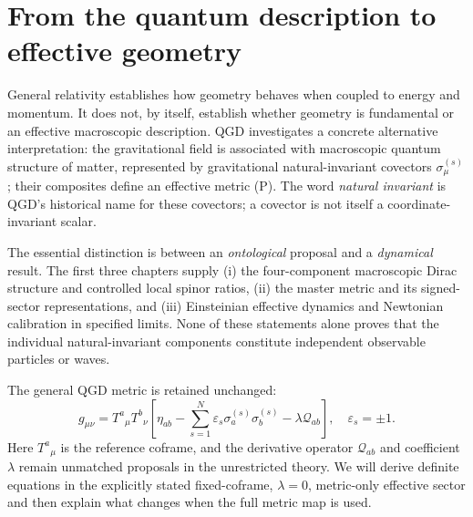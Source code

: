 \documentclass[11pt,a4paper]{article}
\begin{document}
\section{From the quantum description to effective geometry}
\label{sec:motivation}
General relativity establishes how geometry behaves when coupled to
energy and momentum. It does not, by itself, establish whether geometry
is fundamental or an effective macroscopic description. QGD investigates
a concrete alternative interpretation: the gravitational field is
associated with macroscopic quantum structure of matter, represented by
gravitational natural-invariant covectors $\sigma_\mu^{(s)}$; their
composites define an effective metric (P). The word \emph{natural
invariant} is QGD's historical name for these covectors; a covector is
not itself a coordinate-invariant scalar.

The essential distinction is between an \emph{ontological} proposal and a
\emph{dynamical} result. The first three chapters supply (i) the
four-component macroscopic Dirac structure and controlled local spinor
ratios, (ii) the master metric and its signed-sector representations,
and (iii) Einsteinian effective dynamics and Newtonian calibration in
specified limits. None of these statements alone proves that the
individual natural-invariant components constitute independent
observable particles or waves.

The general QGD metric is retained unchanged:
\begin{equation}\label{eq:master}
\boxed{g_{\mu\nu}=T^a{}_{\mu}T^b{}_{\nu}
\left[\eta_{ab}-\sum_{s=1}^{N}\varepsilon_s
\sigma_a^{(s)}\sigma_b^{(s)}-\lambda\mathcal Q_{ab}\right],
\quad \varepsilon_s=\pm1.}
\end{equation}
Here $T^a{}_{\mu}$ is the reference coframe, and the derivative
operator $\mathcal Q_{ab}$ and coefficient $\lambda$ remain
unmatched proposals in the unrestricted theory. We will derive definite
equations in the explicitly stated fixed-coframe, $\lambda=0$,
metric-only effective sector and then explain what changes when the
full metric map is used.
\end{document}
